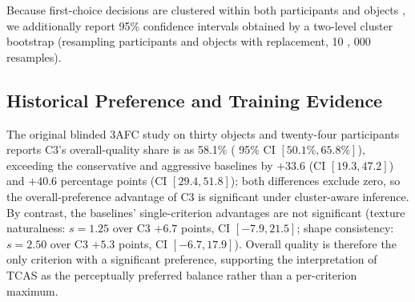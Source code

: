 \documentclass[times,twocolumn,final]{elsarticle}
\providecommand{\DIFadd}[1]{{\protect\color{blue} \sf #1}} %
\providecommand{\DIFdel}[1]{{\protect\color{red} \scriptsize #1}} %
\providecommand{\DIFaddbegin}{} %
\providecommand{\DIFaddend}{} %
\providecommand{\DIFdelbegin}{} %
\providecommand{\DIFdelend}{} %
\begin{document}
\DIFdelbegin \DIFdel{Because first-choice decisions are clustered within both participants and objects , we additionally report 95\% confidence intervals obtained by a two-level cluster bootstrap (resampling participants and objects with replacement, 10}%
\DIFdel{,}%
\DIFdel{000 resamples). }\DIFdelend \DIFaddbegin \subsection{Historical Preference and Training Evidence}
\label{subsec:preference}
\DIFadd{The original blinded 3AFC study on thirty objects and twenty-four participants reports }\DIFaddend C3's overall-quality share \DIFdelbegin \DIFdel{is }\DIFdelend \DIFaddbegin \DIFadd{as }\DIFaddend 58.1\% (\DIFdelbegin \DIFdel{95\% CI $[50.1\%, 65.8\%]$), exceeding the conservative and aggressive baselines by $+33.6$ (CI $[19.3, 47.2]$) and $+40.6$ percentage points (CI $[29.4, 51.8]$); both differences exclude zero, so the overall-preference advantage of C3 is significant under cluster-aware inference. By contrast, the baselines' single-criterion advantages are not significant (texture naturalness: $s = 1.25$ over C3 $+6.7$ points, CI $[-7.9, 21.5]$; shape consistency: $s = 2.50$ over C3 $+5.3$ points, CI $[-6.7, 17.9]$). Overall quality is therefore the only criterion with a significant preference, supporting the interpretation of TCAS as the perceptually preferred balance rather than a per-criterion maximum.
}%

\end{document}
